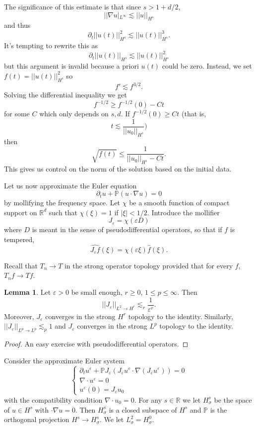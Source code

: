 \documentclass[12pt]{book}
\newcommand{\RR}{\mathbb{R}}
\newcommand{\PP}{\mathbb{P}}
\theoremstyle{definition}
\newtheorem{lemma}[theorem]{Lemma}
\begin{document}
The significance of this estimate is that since $s > 1 + d/2$,
$$||\nabla u|_{L^\infty} \lesssim ||u||_{H^s}$$
and thus
$$\partial_t ||u(t)||_{H^s}^2 \lesssim ||u(t)||_{H^s}^3.$$
It's tempting to rewrite this as
$$\partial_t ||u(t)||_{H^s} \lesssim ||u(t)||_{H^s}^2$$
but this argument is invalid because a priori $u(t)$ could be zero.
Instead, we set $f(t) = ||u(t)||_{H^s}^2$ so
$$f' \lesssim f^{3/2}.$$
Solving the differential inequality we get
$$f^{-1/2} \geq f^{-1/2}(0) - Ct$$
for some $C$ which only depends on $s,d$.
If $f^{-1/2}(0) \geq Ct$
(that is,
$$t \lesssim \frac{1}{||u_0||_{H^s}})$$
then
$$\sqrt{f(t)} \leq \frac{1}{||u_0||_{H^s} - Ct}.$$
This gives us control on the norm of the solution based on the initial data.

Let us now approximate the Euler equation
$$\partial_t u + \PP(u \cdot \nabla u) = 0$$
by mollifying the frequency space.
Let $\chi$ be a smooth function of compact support on $\RR^d$ such that $\chi(\xi) = 1$ if $|\xi| < 1/2$.
Introduce the mollifier
$$J_\varepsilon = \chi(\varepsilon D)$$
where $D$ is meant in the sense of pseudodifferential operators, so that if $f$ is tempered,
$$\widehat{J_\varepsilon f}(\xi) = \chi(\varepsilon \xi) \hat f(\xi).$$

Recall that $T_n \to T$ in the strong operator topology provided that for every $f$, $T_nf \to Tf$.

\begin{lemma}
Let $\varepsilon > 0$ be small enough, $r \geq 0$, $1 \leq p \leq \infty$.
Then
$$||J_\varepsilon||_{L^2 \to H^r} \lesssim_r \frac{1}{\varepsilon^r}.$$
Moreover, $J_\varepsilon$ converges in the strong $H^r$ topology to the identity.
Similarly, $||J_\varepsilon||_{L^p \to L^p} \lesssim_p 1$ and $J_\varepsilon$ converges in the strong $L^p$ topology to the identity.
\end{lemma}
\begin{proof}
An easy exercise with pseudodifferential operators.
\end{proof}

Consider the approximate Euler system
$$\begin{cases}
\partial_t u^\varepsilon + \PP J_\varepsilon(J_\varepsilon u^\varepsilon \cdot \nabla(J_\varepsilon u^\varepsilon)) = 0\\
\nabla \cdot u^\varepsilon = 0\\
u^\varepsilon(0) = J_\varepsilon u_0
\end{cases}$$
with the compatibility condition $\nabla \cdot u_0 = 0$.
For any $s \in \RR$ we let $H^s_\sigma$ be the space of $u \in H^s$ with $\cdot \nabla u = 0$.
Then $H^s_\sigma$ is a closed subspace of $H^s$ and $\PP$ is the orthogonal projection $H^s \to H^s_\sigma$.
We let $L^2_\sigma = H^0_\sigma$.
\end{document}
